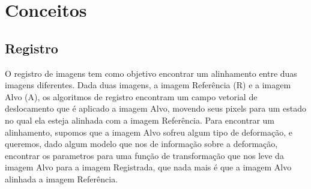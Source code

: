 \chapter{Conceitos}
\label{cap:conceitos}

\section{Registro}
\label{sec:fundamentos}

    O registro de imagens tem como objetivo encontrar um alinhamento entre duas imagens diferentes. Dada duas imagens, 
a imagem Referência (R) e a imagem Alvo (A), os algoritmos de registro encontram um campo
vetorial de deslocamento que é aplicado a imagem Alvo, movendo seus pixels para um estado no qual ela esteja alinhada
com a imagem Referência. Para encontrar um alinhamento, supomos que a imagem Alvo sofreu algum tipo de deformação,
e queremos, dado algum modelo que nos de informação sobre a deformação, encontrar os parametros para uma função de
transformação que nos leve da imagem Alvo para a imagem Registrada, que nada mais é que a imagem Alvo alinhada a imagem
Referência.

